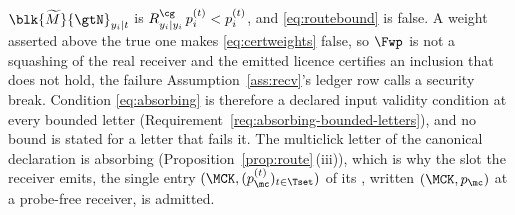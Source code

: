 \begin{remark}
$\blk{\widetilde M}{\gtN}_{y_i|t}$ is $R^{\cg}_{y_i|y_i}\,p^{(t)}_i<p^{(t)}_i$,
and \eqref{eq:routebound} is false. A weight asserted above
the true one makes \eqref{eq:certweights} false, so $\Fwp$ is not a squashing
of the real receiver and the emitted licence certifies an inclusion that does
not hold, the failure Assumption~\ref{ass:recv}'s ledger row calls a security
break. Condition \eqref{eq:absorbing} is therefore a declared input validity
condition at every bounded letter
(Requirement~\ref{req:absorbing-bounded-letters}), and no bound is stated for
a letter that fails it. The multiclick letter of the canonical declaration is
absorbing (Proposition~\ref{prop:route}\,(iii)), which is why the slot the
receiver emits, the single entry $(\MCK,(p^{(t)}_{\mc})_{t\in\Tset})$ of its
, written $(\MCK,p_{\mc})$ at a probe-free receiver,
is admitted.
\end{remark}
